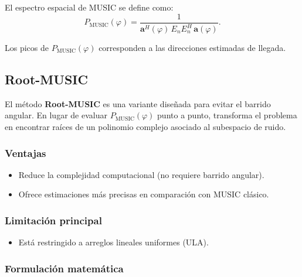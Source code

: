 El espectro espacial de MUSIC se define como:
\begin{equation}
	P_{\text{MUSIC}}(\varphi) = 
	\frac{1}{\mathbf{a}^H(\varphi)\, E_n E_n^H\, \mathbf{a}(\varphi)}.
\end{equation}

Los picos de $P_{\text{MUSIC}}(\varphi)$ corresponden a las direcciones estimadas de llegada.  


\subsection{Root-MUSIC}\label{sec:doa:rootmusic}

El método \textbf{Root-MUSIC} es una variante diseñada para evitar el barrido angular.  
En lugar de evaluar $P_{\text{MUSIC}}(\varphi)$ punto a punto, 
transforma el problema en encontrar raíces de un polinomio complejo asociado al subespacio de ruido.  

\subsubsection*{Ventajas}
\begin{itemize}
	\item Reduce la complejidad computacional (no requiere barrido angular).  
	\item Ofrece estimaciones más precisas en comparación con MUSIC clásico.   
\end{itemize}

\subsubsection*{Limitación principal}
\begin{itemize}
	\item Está restringido a arreglos lineales uniformes (ULA). 
\end{itemize}

\subsubsection*{Formulación matemática}


